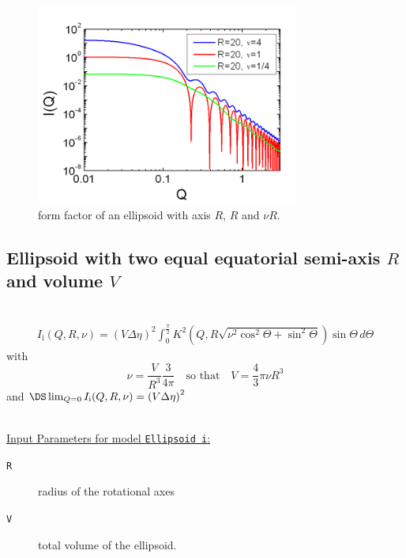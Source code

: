 \begin{figure}[htb]
\begin{center}
\includegraphics[width=0.768\textwidth,height=0.588\textwidth]{../images/form_factor/Ellipsoid/ellipsoid_ii.png}
\end{center}
\caption{form factor of an ellipsoid with axis $R$, $R$ and $\nu
R$.} \label{fig:I_ellipsoid_ii}
\end{figure}


\clearpage
\subsection{Ellipsoid with two equal equatorial semi-axis $R$ and volume $V$}
\label{sect:Ellipsoid_i} ~\\

\begin{align}
I_\text{i}(Q,R,\nu) = \left( V \Delta\eta
\right)^2
 \int_0^{\frac{\pi}{2}}\! K^2\left(Q,R\sqrt{\nu^2\cos^2\Theta+\sin^2\Theta}\right)\sin\Theta\, d\Theta
\end{align}
with
$$
\nu=\frac{V}{R^3}\frac{3}{4\pi} \quad \mbox{so that}\quad V =\frac{4}{3}\pi\nu R^3
$$
and $\DS \lim_{Q=0} I_\text{i}(Q,R,\nu)= \left(V\Delta\eta\right)^2$

~\\
\underline{Input Parameters for model \texttt{Ellipsoid i}:}
\begin{description}
\item[\texttt{R}] radius of the rotational axes
\item[\texttt{V}] total volume of the ellipsoid.
\end{description}

